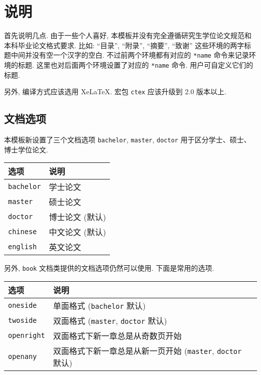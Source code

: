 ﻿\chapter{说明}

首先说明几点. 由于一些个人喜好, 本模板并没有完全遵循研究生学位论文规范和本科毕业论文格式要求. 比如: ``目录'', ``附录'', ``摘要'', ``致谢'' 这些环境的两字标题中间并没有空一个汉字的空白. 不过前两个环境都有对应的 \verb|*name| 命令来记录环境的标题. 这里也对后面两个环境设置了对应的 \verb|*name| 命令. 用户可自定义它们的标题.

另外, 编译方式应该选用 XeLaTeX. 宏包 \verb|ctex| 应该升级到 2.0 版本以上.

\section{文档选项}

本模板新设置了三个文档选项 \verb|bachelor|, \verb|master|, \verb|doctor| 用于区分学士、硕士、博士学位论文.

\begin{center}
  \begin{tabular}{ll}
    \toprule
    选项        & 说明\\
    \midrule
    \verb|bachelor|  & 学士论文\\
    \verb|master|    & 硕士论文\\
    \verb|doctor|    & 博士论文 (默认)\\
    \verb|chinese|   & 中文论文 (默认)\\
    \verb|english|   & 英文论文\\
    \bottomrule
  \end{tabular}
\end{center}

另外, \verb|book| 文档类提供的文档选项仍然可以使用. 下面是常用的选项.

\begin{center}
  \begin{tabular}{lp{}l}
    \toprule
    选项        & 说明\\
    \midrule
    \verb|oneside|   & 单面格式 (\verb|bachelor| 默认)\\
    \verb|twoside|   & 双面格式 (\verb|master|, \verb|doctor| 默认)\\
    \midrule
    \verb|openright| & 双面格式下新一章总是从奇数页开始\\
    \verb|openany|   & 双面格式下新一章总是从新一页开始
                       (\verb|master|, \verb|doctor| 默认)\\
    \bottomrule
  \end{tabular}
\end{center}

